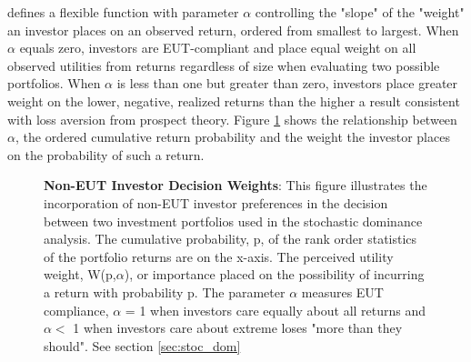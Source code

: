 %
\citet{prelec_probability_1998} defines a flexible function with parameter $\alpha$ controlling the "slope" of the "weight" an investor places on an observed return, ordered from smallest to largest. When $\alpha$ equals zero, investors are EUT-compliant and place equal weight on all observed utilities from returns regardless of size when evaluating two possible portfolios. When $\alpha$ is less than one but greater than zero, investors place greater weight on the lower, negative, realized returns than the higher a result consistent with loss aversion from prospect theory. Figure \ref{fig:sd_ill_graph} shows the relationship between $\alpha$, the ordered cumulative return probability and the weight the investor places on the probability of such a return.\\

\begin{figure}[htb]
	\centering
	\caption{{\bf Non-EUT Investor Decision Weights}: This figure illustrates the incorporation of non-EUT investor preferences in the decision between two investment portfolios used in the stochastic dominance analysis. The cumulative probability, p, of the rank order statistics of the portfolio returns are on the x-axis. The perceived utility weight, W(p,$\alpha$), or importance placed on the possibility of incurring a return with probability p. The parameter $\alpha$ measures EUT compliance, $\alpha$ = 1 when investors care equally about all returns and $\alpha <$ 1 when investors care about extreme loses "more than they should". See section \ref{sec:stoc_dom}} \label{fig:sd_ill_graph}
	
\end{figure}

